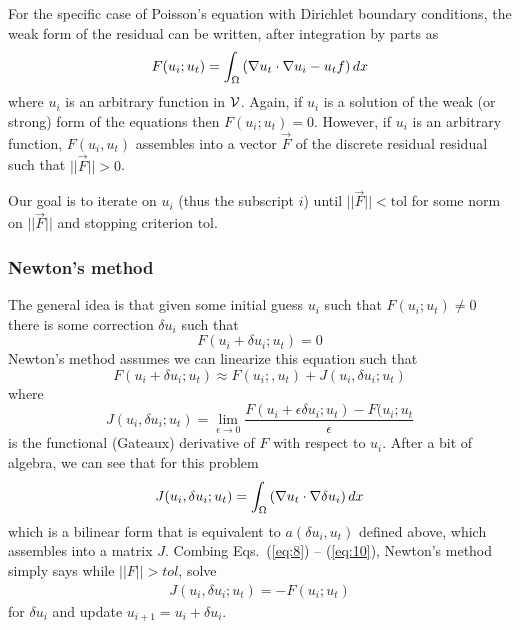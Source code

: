 \documentclass[10pt,twoside,openright]{memoir}
\begin{document}
For the specific case of Poisson's equation with Dirichlet boundary conditions,
the weak form of the residual can be written, after integration by
parts as
\begin{equation}
  \label{eq:4}
  F(u_{i};u_{t}) = \int_{\Omega}
  \left(
    \nabla u_{t}\cdot\nabla u_{i} - u_{t}f
  \right)dx
\end{equation}
where $u_{i}$ is an arbitrary function in $\mathcal{V}$.   Again, if
$u_{i}$ is a solution of the weak (or strong) form of the equations
then $F(u_{i};u_{t})=0$.  However, if  $u_{i}$ is an arbitrary
function, $F(u_{i},u_{t})$ assembles into a vector $\vec{F}$ of the
discrete residual residual such that $||\vec{F}||>0$.  

Our goal is to iterate on $u_{i}$ (thus the subscript
$i$) until $||\vec{F}||<\mathrm{tol}$ for some norm on $||\vec{F}||$ and stopping
criterion $\mathrm{tol}$.

\subsubsection{Newton's method}
\label{sec:newtons-method}

The general idea is that given some initial guess $u_{i}$ such that
$F(u_{i}; u_{t}) \neq 0$ there is some correction $\delta u_{i}$ such
that
\begin{equation}
  \label{eq:8}
  F(u_{i} + \delta u_{i}; u_{t}) = 0
\end{equation}
Newton's method assumes we can linearize this equation such that
\begin{equation}
  \label{eq:9}
   F(u_{i} + \delta u_{i}; u_{t}) \approx F(u_{i};,u_{t}) +
   J(u_{i},\delta u_{i}; u_{t})
\end{equation}
where 
\begin{equation}
  \label{eq:10}
  J(u_{i},\delta u_{i}; u_{t}) = \lim_{\epsilon\rightarrow 0}
  \frac{F(u_{i}+\epsilon\delta u_{i};u_{t}) - F(u_{i};u_{t}}{\epsilon}
\end{equation}
is the functional (Gateaux) derivative of $F$ with respect to
$u_{i}$.  After a bit of algebra, we can see that for this problem
\begin{equation}
  \label{eq:11}
  J(u_{i},\delta u_{i}; u_{t}) = \int_{\Omega} \left(
    \nabla u_{t}\cdot\nabla \delta u_{i} \right)dx
\end{equation}
which is a bilinear form that is equivalent to $a(\delta u_{i},u_{t})$
defined above, which assembles into a matrix $J$. Combing Eqs.\
(\ref{eq:8}) -- (\ref{eq:10}), Newton's method
simply says while $||F||> tol$, solve
\begin{align}
  \label{eq:12}
  J(u_{i},\delta u_{i}; u_{t}) = -F(u_{i};u_{t})
\end{align}
for $\delta u_{i}$ and update $u_{i+1} = u_{i} + \delta u_{i}$.
\end{document}
